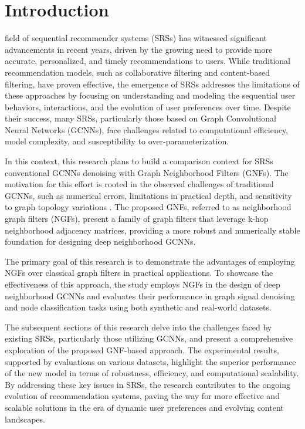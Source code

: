 \documentclass[journal]{IEEEtran}
\begin{document}
\section{Introduction}

 field of sequential recommender systems (SRSs) has witnessed significant advancements 
in recent years, driven by the growing need to provide more accurate, personalized, and timely recommendations 
to users. While traditional recommendation models, such as collaborative filtering and content-based filtering, 
have proven effective, the emergence of SRSs addresses the limitations of these approaches by focusing on 
understanding and modeling the sequential user behaviors, interactions, and the evolution of user preferences 
over time. Despite their success, many SRSs, particularly those based on Graph Convolutional Neural Networks 
(GCNNs), face challenges related to computational efficiency, model complexity, and susceptibility to 
over-parameterization.

In this context, this research plans to build a comparison context for SRSs conventional GCNNs denoising
with Graph Neighborhood Filters (GNFs). The motivation for this effort is rooted in the observed challenges 
of traditional GCNNs, such as numerical errors, limitations in practical depth, and sensitivity to graph 
topology variations \cite{tenorio2021robust}. The proposed GNFs, referred to as neighborhood graph filters (NGFs), present a family 
of graph filters that leverage k-hop neighborhood adjacency matrices, providing a more robust and numerically 
stable foundation for designing deep neighborhood GCNNs.

The primary goal of this research is to demonstrate the advantages of employing NGFs over classical graph filters 
in practical applications. To showcase the effectiveness of this approach, the study employs NGFs in the design 
of deep neighborhood GCNNs and evaluates their performance in graph signal denoising \cite{tenorio2021robust} \cite{FENG2022113} 
and node classification tasks using both synthetic and real-world datasets.

The subsequent sections of this research delve into the challenges faced by existing SRSs, particularly those 
utilizing GCNNs, and present a comprehensive exploration of the proposed GNF-based approach. The experimental 
results, supported by evaluations on various datasets, highlight the superior performance of the new model in 
terms of robustness, efficiency, and computational scalability. By addressing these key issues in SRSs, the 
research contributes to the ongoing evolution of recommendation systems, paving the way for more effective and 
scalable solutions in the era of dynamic user preferences and evolving content landscapes.
\end{document}
